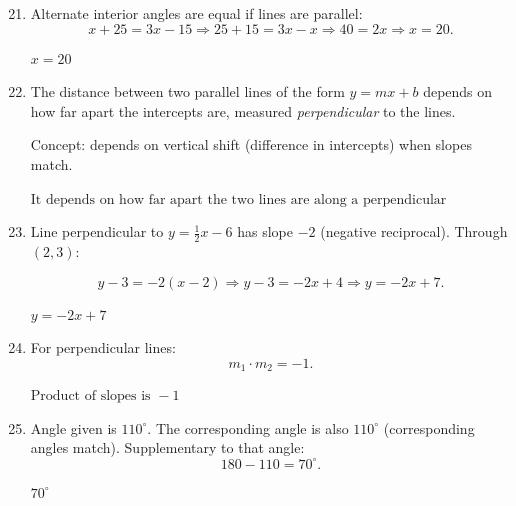 \documentclass[14pt]{extarticle}
\begin{document}
\begin{enumerate}
  \setcounter{enumi}{20}
  \item Alternate interior angles are equal if lines are parallel:
  \[
  x + 25 = 3x - 15
  \Rightarrow 25 + 15 = 3x - x
  \Rightarrow 40 = 2x
  \Rightarrow x = 20.
  \]

  \(\boxed{x = 20}\)

  \item The distance between two parallel lines of the form \(y = mx + b\) depends on how far apart the intercepts are, measured \textit{perpendicular} to the lines.

  Concept: depends on vertical shift (difference in intercepts) when slopes match.

  \(\boxed{\text{It depends on how far apart the two lines are along a perpendicular}}\)

  \item Line perpendicular to \(y = \tfrac{1}{2}x - 6\) has slope \(-2\) (negative reciprocal).  
  Through \((2,3)\):

  \[
  y - 3 = -2(x - 2)
  \Rightarrow y - 3 = -2x + 4
  \Rightarrow y = -2x + 7.
  \]

  \(\boxed{y = -2x + 7}\)

  \item For perpendicular lines:
  \[
  m_1 \cdot m_2 = -1.
  \]

  \(\boxed{\text{Product of slopes is } -1}\)

  \item Angle given is \(110^\circ.\) The corresponding angle is also \(110^\circ\) (corresponding angles match).  
  Supplementary to that angle:
  \[
  180 - 110 = 70^\circ.
  \]

  \(\boxed{70^\circ}\)
\end{enumerate}




\end{document}
